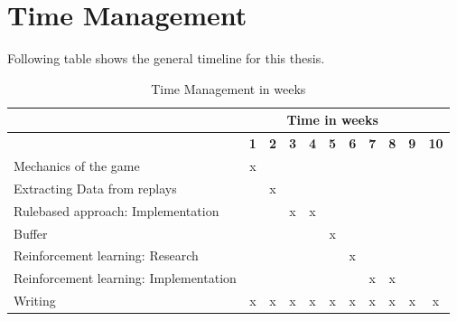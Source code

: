 \documentclass{article}
\begin{document}
\section{Time Management}
Following table shows the general timeline for this thesis. 
\begin{table}[ht]
    \centering
    \begin{tabular}{|l|c|c|c|c|c|c|c|c|c|c|}
    \hline
     & \multicolumn{9}{c}{Time in weeks}  & \\ \hline
     & \textbf{1} & \textbf{2} & \textbf{3} & \textbf{4} & \textbf{5} & \textbf{6} & \textbf{7} & \textbf{8} & \textbf{9} & \textbf{10} \\ \hline
    Mechanics of the game                       & x &   &   &   &   &   &   &   &   &   \\ \hline
    Extracting Data from replays                &   & x &   &   &   &   &   &   &   &   \\ \hline
    Rulebased approach: Implementation          &   &   & x & x &   &   &   &   &   &   \\ \hline
    Buffer                                      &   &   &   &   & x &   &   &   &   &   \\ \hline
    Reinforcement learning: Research            &   &   &   &   &   & x &   &   &   &   \\ \hline
    Reinforcement learning: Implementation      &   &   &   &   &   &   & x & x &   &   \\ \hline
    Writing                                     & x & x & x & x & x & x & x & x & x & x \\ \hline
    \end{tabular}
    \caption{Time Management in weeks}
\end{table}
\end{document}
